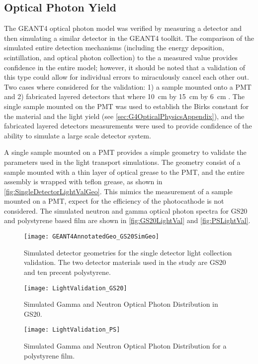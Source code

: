 \subsection{Optical Photon Yield}
\label{sec:OpticalPhotonValidation}
The GEANT4 optical photon model was verified by measuring a detector and then simulating a similar detector in the GEANT4 toolkit. 
The comparison of the simulated entire  detection mechanisms (including the energy deposition, scintillation, and optical photon collection) to the a measured value provides confidence in the entire model; however, it should be noted that a validation of this type could allow for individual errors to miraculously cancel each other out.
Two cases where considered for the validation: 1) a sample mounted onto a PMT and 2) fabricated layered detectors that where  \SI{10}{cm} by \SI{15}{cm} by \SI{6}{cm} .
The single sample mounted on the PMT was used to establish the Birks constant for the material and the light yield (see \autoref{sec:G4OpticalPhysicsAppendix}), and the fabricated layered detectors measurements were used to provide confidence of the ability to simulate a large scale detector system.

A single sample mounted on a PMT provides a simple geometry to validate the parameters used in the light transport simulations. 
The geometry consist of a sample mounted with a thin layer of optical grease to the PMT, and the entire assembly is wrapped with teflon grease, as shown in \autoref{fig:SingleDetectorLightValGeo}.
This mimics the measurement of a sample mounted on a PMT, expect for the efficiency of the photocathode is not considered.
The simulated neutron and gamma optical photon spectra for GS20 and polystyrene based film are shown in \autoref{fig:GS20LightVal} and \autoref{fig:PSLightVal}.
\begin{figure}
	\centering
	\texttt{[image: GEANT4AnnotatedGeo\_GS20SimGeo]}
	\caption[Simulated Detector Geometry for Single Detectors]{Simulated detector geometries for the single detector light collection validation. The two detector materials used in the study are GS20 and ten precent  polystyrene.}
	\label{fig:SingleDetectorLightValGeo}
\end{figure}
\begin{figure}
	\centering
	\texttt{[image: LightValidation\_GS20]}
	\caption{Simulated Gamma and Neutron Optical Photon Distribution in GS20. \LightYieldEDepSimGeo}
	\label{fig:GS20LightVal}
\end{figure}
\begin{figure}
	\centering
	\texttt{[image: LightValidation\_PS]}
	\caption{Simulated Gamma and Neutron Optical Photon Distribution for a polystyrene film. \LightYieldEDepSimGeo}
	\label{fig:PSLightVal}
\end{figure}


